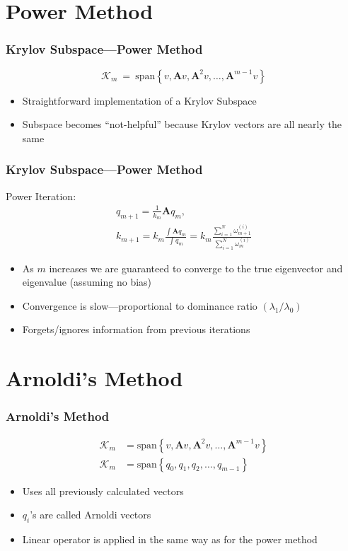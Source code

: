 \documentclass[color={usenames, dvipsnames},ignorenonframetext]{beamer}
\newcommand{\A}{\mathbf{A}}
\begin{document}
\section{Power Method}
\begin{frame}
    \frametitle{Krylov Subspace---Power Method}
    \begin{equation*}
        \mathcal{K}_m~=~\mathrm{span}\left\{v, \A v, \A^2v, \ldots , \A^{m-1}v\right\}
    \end{equation*}
    \begin{itemize}
        \item Straightforward implementation of a Krylov Subspace
        \item Subspace becomes ``not-helpful'' because Krylov vectors are all nearly the same
    \end{itemize}
\end{frame}

\begin{frame}
    \frametitle{Krylov Subspace---Power Method}
    Power Iteration:
    \begin{gather*}
        q_{m+1} = \frac{1}{k_{m}}\mathbf{A}q_{m}, \\[2mm]
        k_{m+1} = k_{m}\frac{\int \A q_{m}}{\int q_{m}} = k_{m}\frac{\sum_{i=1}^{N} \omega_{m+1}^{(i)}}{\sum_{i=1}^{N} \omega_m^{(i)}}
    \end{gather*}
    \begin{itemize}
        \item As $m$ increases we are guaranteed to converge to the true eigenvector and eigenvalue (assuming no bias)
        \item Convergence is slow---proportional to dominance ratio $\left( \lambda_1/\lambda_0 \right)$
        \item Forgets/ignores information from previous iterations
    \end{itemize}
\end{frame}

\section{Arnoldi's Method}
\begin{frame}
    \frametitle{Arnoldi's Method}
    \begin{align*}
        \mathcal{K}_m &= \mathrm{span}\left\{v, \A v, \A^2v, \ldots , \A^{m-1}v\right\} \\
        \mathcal{K}_m &= \mathrm{span}\left\{q_0, q_1, q_2, \ldots , q_{m-1}\right\}
    \end{align*}
    \begin{itemize}
        \item Uses all previously calculated vectors
        \item $q_i$'s are called Arnoldi vectors
        \item Linear operator is applied in the same way as for the power method
    \end{itemize}
\end{frame}
\end{document}
